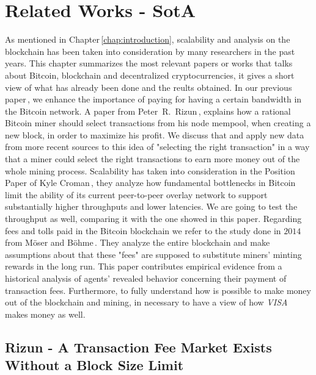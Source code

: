 \documentclass[USenglish]{uit-thesis}
\begin{document}
\chapter{Related Works - SotA}
\label{chap:prev_works}
As mentioned in Chapter\,\ref{chap:introduction},
scalability and analysis on the blockchain has been taken into consideration
by many researchers in the past years.
This chapter summarizes the most relevant papers or
works that talks about Bitcoin,
blockchain and decentralized cryptocurrencies,
it gives a short view of what has already been done and
the reults obtained.
In our previous paper\,\cite{Tedeschi:2016:PBB}, we enhance
the importance of paying for having a certain
bandwidth in the Bitcoin network.
A paper
from Peter~R.~Rizun\,\cite{Rizun:2015:blocksizelimit},
explains how a rational Bitcoin
miner should select transactions from his node mempool,
when creating a new block,
in order to maximize his profit. We discuss that and apply
new data from more recent sources to this idea of
"selecting the right transaction" in a way that a miner could
select the right transactions to earn more money out of the whole
mining process.
Scalability has taken into consideration
in the Position Paper of Kyle Croman\,\cite{croman2016}, they
analyze how fundamental bottlenecks in Bitcoin limit the ability
of its current peer-to-peer
overlay network to support substantially higher
throughputs and lower latencies. We are
going to test the throughput as well, comparing it with the one
showed in this paper.
Regarding fees and tolls paid in the Bitcoin blockchain
we refer to the study done in $2014$ from Möser and
Böhme\,\cite{Moser2015}. They analyze the
entire blockchain and make assumptions about
that these "fees" are supposed to substitute miners'
minting rewards in the long run. This paper
contributes empirical evidence from a historical
analysis of agents' revealed behavior concerning
their payment of transaction fees.
Furthermore, to fully understand how is possible
to make money out of the blockchain and mining,
in necessary to have a view of
how \emph{VISA}\,\cite{visa} makes money as well.

\section{Rizun - A Transaction Fee Market Exists Without a Block Size Limit}
\label{sec:rizun}
\end{document}
